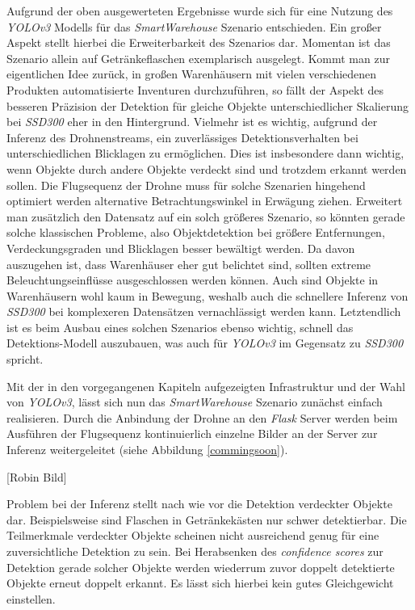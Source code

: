 Aufgrund der oben ausgewerteten Ergebnisse wurde sich für eine Nutzung des \textit{YOLOv3} Modells für das \textit{SmartWarehouse} Szenario entschieden. Ein großer Aspekt stellt hierbei die Erweiterbarkeit des Szenarios dar. Momentan ist das Szenario allein auf Getränkeflaschen exemplarisch ausgelegt. Kommt man zur eigentlichen Idee zurück, in großen Warenhäusern mit vielen verschiedenen Produkten automatisierte Inventuren durchzuführen, so fällt der Aspekt des besseren Präzision der Detektion für gleiche Objekte unterschiedlicher Skalierung bei \textit{SSD300} eher in den Hintergrund. Vielmehr ist es wichtig, aufgrund der Inferenz des Drohnenstreams, ein zuverlässiges Detektionsverhalten bei unterschiedlichen Blicklagen zu ermöglichen. Dies ist insbesondere dann wichtig, wenn Objekte durch andere Objekte verdeckt sind und trotzdem erkannt werden sollen. Die Flugsequenz der Drohne muss für solche Szenarien hingehend optimiert werden alternative Betrachtungswinkel in Erwägung ziehen. Erweitert man zusätzlich den Datensatz auf ein solch größeres Szenario, so könnten gerade solche klassischen Probleme, also Objektdetektion bei größere Entfernungen, Verdeckungsgraden und Blicklagen besser bewältigt werden. Da davon auszugehen ist, dass Warenhäuser eher gut belichtet sind, sollten extreme Beleuchtungseinflüsse ausgeschlossen werden können. Auch sind Objekte in Warenhäusern wohl kaum in Bewegung, weshalb auch die schnellere Inferenz von \textit{SSD300} bei komplexeren Datensätzen vernachlässigt werden kann. Letztendlich ist es beim Ausbau eines solchen Szenarios ebenso wichtig, schnell das Detektions-Modell auszubauen, was auch für \textit{YOLOv3} im Gegensatz zu \textit{SSD300} spricht. 

Mit der in den vorgegangenen Kapiteln aufgezeigten Infrastruktur und der Wahl von \textit{YOLOv3}, lässt sich nun das \textit{SmartWarehouse} Szenario zunächst einfach realisieren. Durch die Anbindung der Drohne an den \textit{Flask} Server werden beim Ausführen der Flugsequenz kontinuierlich einzelne Bilder an der Server zur Inferenz weitergeleitet (siehe Abbildung \ref{commingsoon}). 

[Robin Bild]

Problem bei der Inferenz stellt nach wie vor die Detektion verdeckter Objekte dar. Beispielsweise sind Flaschen in Getränkekästen nur schwer detektierbar. Die Teilmerkmale verdeckter Objekte scheinen nicht ausreichend genug für eine zuversichtliche Detektion zu sein. Bei Herabsenken des \textit{confidence scores} zur Detektion gerade solcher Objekte werden wiederrum zuvor doppelt detektierte Objekte erneut doppelt erkannt. Es lässt sich hierbei kein gutes Gleichgewicht einstellen. 

